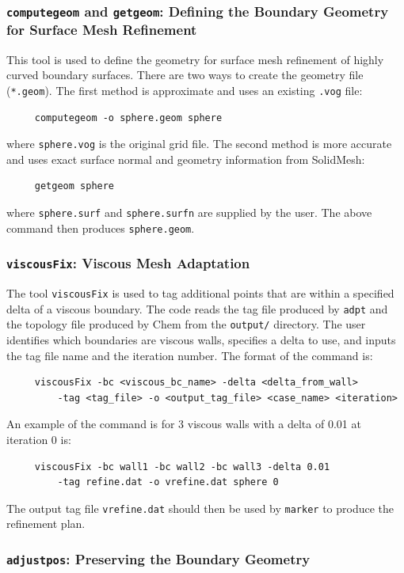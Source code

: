 \subsubsection{{\tt computegeom} and {\tt getgeom}: Defining the Boundary Geometry for Surface Mesh Refinement}

This tool is used to define the geometry for surface mesh refinement
of highly curved boundary surfaces.  There are two ways to create the
geometry file (\verb!*.geom!).  The first method is approximate and
uses an existing \verb!.vog! file:
\begin{verbatim}
     computegeom -o sphere.geom sphere
\end{verbatim}
where \verb!sphere.vog! is the original grid file.  The second method is more accurate and uses exact surface normal and geometry information from SolidMesh:
\begin{verbatim}
     getgeom sphere
\end{verbatim}
where \verb!sphere.surf! and \verb!sphere.surfn! are supplied by the user.  The above command then produces \verb!sphere.geom!.


\subsubsection{{\tt viscousFix}: Viscous Mesh Adaptation}

The tool \verb!viscousFix! is used to tag additional points that are
within a specified delta of a viscous boundary.  The code reads the
tag file produced by \verb!adpt! and the topology file produced by
Chem from the \verb!output/! directory.  The user identifies which
boundaries are viscous walls, specifies a delta to use, and inputs the
tag file name and the iteration number.  The format of the command is:
\begin{verbatim}
     viscousFix -bc <viscous_bc_name> -delta <delta_from_wall>
         -tag <tag_file> -o <output_tag_file> <case_name> <iteration>
\end{verbatim}
An example of the command is for 3 viscous walls with a delta of 0.01 at iteration 0 is:
\begin{verbatim}
     viscousFix -bc wall1 -bc wall2 -bc wall3 -delta 0.01
         -tag refine.dat -o vrefine.dat sphere 0
\end{verbatim}
The output tag file \verb!vrefine.dat! should then be used by \verb!marker! to produce the refinement plan.


\subsubsection{{\tt adjustpos}: Preserving the Boundary Geometry}

